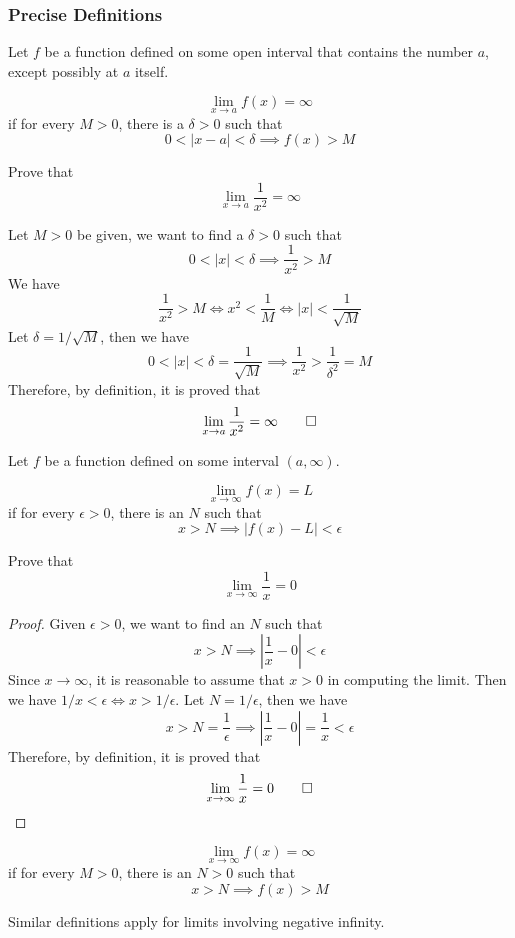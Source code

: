 \subsubsection{Precise Definitions}
Let \(f\) be a function defined on some open interval that contains the number
\(a\), except possibly at \(a\) itself.
\begin{definition}
    \[\lim_{x\to a}f(x)=\infty\] if for every \(M>0\), there is a
    \(\delta>0\) such that \[0<|x-a|<\delta\implies f(x)>M\]
\end{definition}
\begin{problem}
    Prove that \[\lim_{x\to a}\frac{1}{x^2}=\infty\]
\end{problem}
\begin{solution}
    Let \(M>0\) be given, we want to find a \(\delta>0\) such that
    \[0<|x|<\delta\implies\frac{1}{x^2}>M\]
    We have
    \[\frac{1}{x^2}>M\iff x^2<\frac{1}{M}\iff|x|<\frac{1}{\sqrt{M}}\]
    Let \(\delta=1/\sqrt{M}\), then we have
    \[0<|x|<\delta=\frac{1}{\sqrt{M}}\implies\frac{1}{x^2}>\frac{1}{\delta^2}=M\]
    Therefore, by definition, it is proved that
    \[\lim_{x\to a}\frac{1}{x^2}=\infty\qedhere\]
\end{solution}
Let \(f\) be a function defined on some interval \((a,\infty)\).
\begin{definition}
    \[\lim_{x\to \infty}f(x)=L\] if for every \(\epsilon>0\), there is an \(N\)
    such that \[x>N\implies|f(x)-L|<\epsilon\]
\end{definition}
\begin{problem}
    Prove that \[\lim_{x\to \infty}\frac{1}{x}=0\]
\end{problem}
\begin{proof}
    Given \(\epsilon>0\), we want to find an \(N\) such that
    \[x>N\implies\left|\frac{1}{x}-0\right|<\epsilon\]
    Since \(x\to \infty\), it is reasonable to assume that \(x>0\) in
    computing the limit.
    Then we have \(1/x<\epsilon\iff x>1/\epsilon\).
    Let \(N=1/\epsilon\), then we have
    \[x>N=\frac{1}{\epsilon}\implies\left|\frac{1}{x}-0\right|=\frac{1}{x}
    <\epsilon\]
    Therefore, by definition, it is proved that
    \[\lim_{x\to \infty}\frac{1}{x}=0\qedhere\]
\end{proof}
\begin{definition}
    \[\lim_{x\to \infty}f(x)=\infty\] if for every \(M>0\), there is an \(N>0\)
    such that \[x>N\implies f(x)>M\]
\end{definition}
Similar definitions apply for limits involving negative infinity.